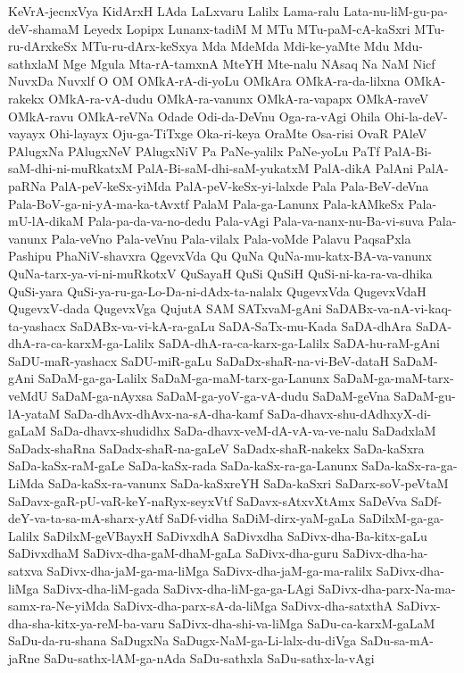 {KeVrA-jecnxVya
KidArxH
LAda
LaLxvaru
Lalilx
Lama-ralu
Lata-nu-liM-gu-pa-deV-shamaM
Leyedx
Lopipx
Lunanx-tadiM
M
MTu
MTu-paM-cA-kaSxri
MTu-ru-dArxkeSx
MTu-ru-dArx-keSxya
Mda
MdeMda
Mdi-ke-yaMte
Mdu
Mdu-sathxlaM
Mge
Mgula
Mta-rA-tamxnA
MteYH
Mte-nalu
NAsaq
Na
NaM
Nicf
NuvxDa
Nuvxlf
O
OM
OMkA-rA-di-yoLu
OMkAra
OMkA-ra-da-lilxna
OMkA-rakekx
OMkA-ra-vA-dudu
OMkA-ra-vanunx
OMkA-ra-vapapx
OMkA-raveV
OMkA-ravu
OMkA-reVNa
Odade
Odi-da-DeVnu
Oga-ra-vAgi
Ohila
Ohi-la-deV-vayayx
Ohi-layayx
Oju-ga-TiTxge
Oka-ri-keya
OraMte
Osa-risi
OvaR
PAleV
PAlugxNa
PAlugxNeV
PAlugxNiV
Pa
PaNe-yalilx
PaNe-yoLu
PaTf
PalA-Bi-saM-dhi-ni-muRkatxM
PalA-Bi-saM-dhi-saM-yukatxM
PalA-dikA
PalAni
PalA-paRNa
PalA-peV-keSx-yiMda
PalA-peV-keSx-yi-lalxde
Pala
Pala-BeV-deVna
Pala-BoV-ga-ni-yA-ma-ka-tAvxtf
PalaM
Pala-ga-Lanunx
Pala-kAMkeSx
Pala-mU-lA-dikaM
Pala-pa-da-va-no-dedu
Pala-vAgi
Pala-va-nanx-nu-Ba-vi-suva
Pala-vanunx
Pala-veVno
Pala-veVnu
Pala-vilalx
Pala-voMde
Palavu
PaqsaPxla
Pashipu
PhaNiV-shavxra
QgevxVda
Qu
QuNa
QuNa-mu-katx-BA-va-vanunx
QuNa-tarx-ya-vi-ni-muRkotxV
QuSayaH
QuSi
QuSiH
QuSi-ni-ka-ra-va-dhika
QuSi-yara
QuSi-ya-ru-ga-Lo-Da-ni-dAdx-ta-nalalx
QugevxVda
QugevxVdaH
QugevxV-dada
QugevxVga
QujutA
SAM
SATxvaM-gAni
SaDABx-va-nA-vi-kaq-ta-yashacx
SaDABx-va-vi-kA-ra-gaLu
SaDA-SaTx-mu-Kada
SaDA-dhAra
SaDA-dhA-ra-ca-karxM-ga-Lalilx
SaDA-dhA-ra-ca-karx-ga-Lalilx
SaDA-hu-raM-gAni
SaDU-maR-yashacx
SaDU-miR-gaLu
SaDaDx-shaR-na-vi-BeV-dataH
SaDaM-gAni
SaDaM-ga-ga-Lalilx
SaDaM-ga-maM-tarx-ga-Lanunx
SaDaM-ga-maM-tarx-veMdU
SaDaM-ga-nAyxsa
SaDaM-ga-yoV-ga-vA-dudu
SaDaM-geVna
SaDaM-gu-lA-yataM
SaDa-dhAvx-dhAvx-na-sA-dha-kamf
SaDa-dhavx-shu-dAdhxyX-di-gaLaM
SaDa-dhavx-shudidhx
SaDa-dhavx-veM-dA-vA-va-ve-nalu
SaDadxlaM
SaDadx-shaRna
SaDadx-shaR-na-gaLeV
SaDadx-shaR-nakekx
SaDa-kaSxra
SaDa-kaSx-raM-gaLe
SaDa-kaSx-rada
SaDa-kaSx-ra-ga-Lanunx
SaDa-kaSx-ra-ga-LiMda
SaDa-kaSx-ra-vanunx
SaDa-kaSxreYH
SaDa-kaSxri
SaDarx-soV-peVtaM
SaDavx-gaR-pU-vaR-keY-naRyx-seyxVtf
SaDavx-sAtxvXtAmx
SaDeVva
SaDf-deY-va-ta-sa-mA-sharx-yAtf
SaDf-vidha
SaDiM-dirx-yaM-gaLa
SaDilxM-ga-ga-Lalilx
SaDilxM-geVBayxH
SaDivxdhA
SaDivxdha
SaDivx-dha-Ba-kitx-gaLu
SaDivxdhaM
SaDivx-dha-gaM-dhaM-gaLa
SaDivx-dha-guru
SaDivx-dha-ha-satxva
SaDivx-dha-jaM-ga-ma-liMga
SaDivx-dha-jaM-ga-ma-ralilx
SaDivx-dha-liMga
SaDivx-dha-liM-gada
SaDivx-dha-liM-ga-ga-LAgi
SaDivx-dha-parx-Na-ma-samx-ra-Ne-yiMda
SaDivx-dha-parx-sA-da-liMga
SaDivx-dha-satxthA
SaDivx-dha-sha-kitx-ya-reM-ba-varu
SaDivx-dha-shi-va-liMga
SaDu-ca-karxM-gaLaM
SaDu-da-ru-shana
SaDugxNa
SaDugx-NaM-ga-Li-lalx-du-diVga
SaDu-sa-mA-jaRne
SaDu-sathx-lAM-ga-nAda
SaDu-sathxla
SaDu-sathx-la-vAgi
}
